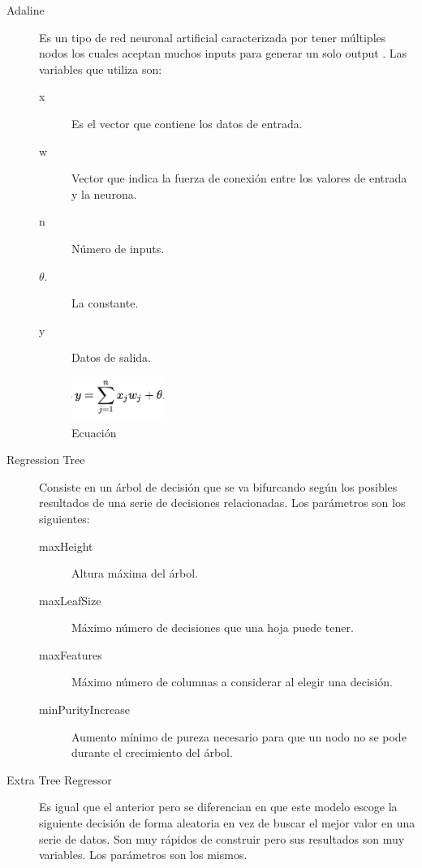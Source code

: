 \begin{description}
    \item [Adaline] Es un tipo de red neuronal artificial caracterizada por tener múltiples nodos los cuales aceptan muchos inputs para generar un solo output \cite{Adaline}. Las variables que utiliza son:
    \begin{description}
        \item [x] Es el vector que contiene los datos de entrada.
        \item [w] Vector que indica la fuerza de conexión entre los valores de entrada y la neurona.
        \item [n] Número de inputs.
        \item [\begin{math}\theta \end{math}.] La constante.
        \item [y] Datos de salida.
    \end{description}
    \begin{figure}[!h]
		\centering
		\includegraphics[width=0.3\textwidth]{imagenes/adaline}
		\caption{Ecuación}\label{fig:Ecuación}
	\end{figure}
	\item [Regression Tree] Consiste en un árbol de decisión que se va bifurcando según los posibles resultados de una serie de decisiones relacionadas. Los parámetros son los siguientes:
	\begin{description}
	    \item [maxHeight] Altura máxima del árbol.
	    \item [maxLeafSize] Máximo número de decisiones que una hoja puede tener.
	    \item [maxFeatures] Máximo número de columnas a considerar al elegir una decisión.
	    \item [minPurityIncrease] Aumento mínimo de pureza necesario para que un nodo no se pode durante el crecimiento del árbol.
	\end{description}
	\item [Extra Tree Regressor] Es igual que el anterior pero se diferencian en que este modelo escoge la siguiente decisión de forma aleatoria en vez de buscar el mejor valor en una serie de datos. Son muy rápidos de construir pero sus resultados son muy variables. Los parámetros son los mismos.

\end{description}
